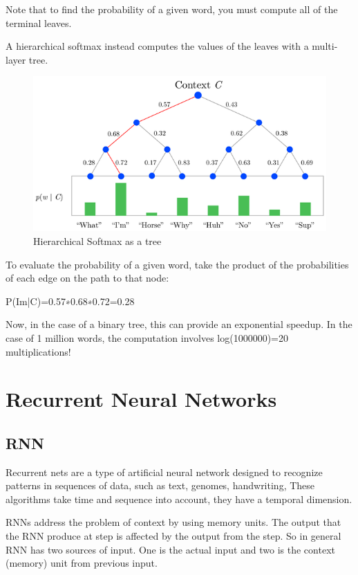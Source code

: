 Note that to find the probability of a given word, you must compute all of the terminal leaves.

A hierarchical softmax instead computes the values of the leaves with a multi-layer tree.

\begin{figure}[ht]
    \centering
    \includegraphics[scale=0.7]{Images/hsmx2.png}
    \caption{Hierarchical Softmax as a tree}
    \label{fig:smxtree}
\end{figure}

To evaluate the probability of a given word, take the product of the probabilities of each edge on the path to that node:

P(Im|C)=0.57∗0.68∗0.72=0.28

Now, in the case of a binary tree, this can provide an exponential speedup. In the case of 1 million words, the computation involves log(1000000)=20 multiplications!


\section{Recurrent Neural Networks}
\subsection{RNN}

Recurrent nets are a type of artificial neural network designed to recognize patterns in sequences of data, such as text, genomes, handwriting, These algorithms take time and sequence into account, they have a temporal dimension.

RNNs address the problem of context by using memory units. The output that the RNN produce at step is affected by the output from the step. So in general RNN has two sources of input. One is the actual input and two is the context (memory) unit from previous input.

